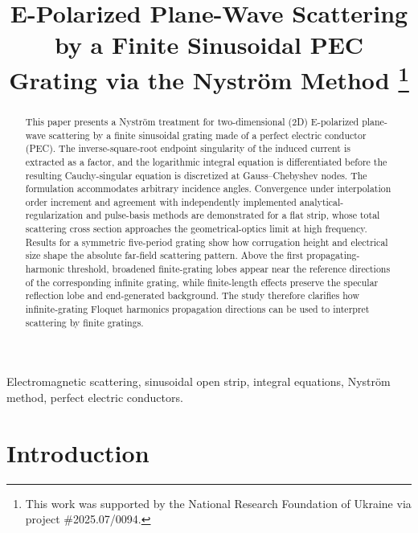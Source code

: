 \documentclass[conference]{IEEEtran}
\begin{document}
\title{E-Polarized Plane-Wave Scattering by a Finite 
Sinusoidal PEC Grating via the Nystr\"om Method%
\thanks{This work was supported by the National Research 
Foundation of Ukraine via project \#2025.07/0094.}}

\author{
}

\maketitle

\begin{abstract}
This paper presents a Nystr\"om treatment for two-dimensional (2D) E-polarized
plane-wave scattering by a finite sinusoidal grating made of a perfect electric
conductor (PEC). The inverse-square-root endpoint singularity of the induced current
is extracted as a factor, and the logarithmic integral equation is
differentiated before the resulting Cauchy-singular equation is discretized at
Gauss--Chebyshev nodes. The formulation accommodates arbitrary incidence
angles. Convergence under interpolation order increment and agreement with independently
implemented analytical-regularization and pulse-basis methods are demonstrated
for a flat strip, whose total scattering cross section approaches the
geometrical-optics limit at high frequency. Results for a symmetric five-period
grating show how corrugation height and electrical size shape the
absolute far-field scattering pattern. Above the first
propagating-harmonic threshold, broadened finite-grating lobes appear near the
reference directions of the corresponding infinite grating, while finite-length
effects preserve the specular reflection lobe and end-generated background. The
study therefore clarifies how infinite-grating Floquet harmonics propagation directions can be used to
interpret scattering by finite gratings.
\end{abstract}

\begin{IEEEkeywords}
Electromagnetic scattering, sinusoidal open strip, integral equations, Nystr\"om
method, perfect electric conductors.
\end{IEEEkeywords}

\section{Introduction}
\end{document}
